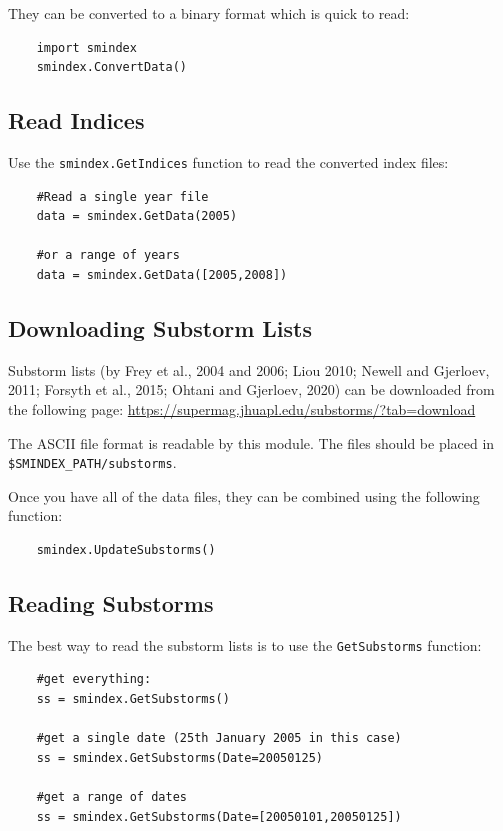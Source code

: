 	They can be converted to a binary format which is quick to read:
	
	\begin{verbatim}
	import smindex
	smindex.ConvertData()
	\end{verbatim}
	
	\subsection{Read Indices}
	
	Use the \texttt{smindex.GetIndices} function to read the converted index files:
	
	\begin{verbatim}
	#Read a single year file
	data = smindex.GetData(2005)
	
	#or a range of years
	data = smindex.GetData([2005,2008])
	\end{verbatim}
	
	\subsection{Downloading Substorm Lists}
	
	Substorm lists (by Frey et al., 2004 and 2006; Liou 2010; Newell and Gjerloev, 2011; Forsyth et al., 2015; Ohtani and Gjerloev, 2020) can be downloaded from the following page: \url{https://supermag.jhuapl.edu/substorms/?tab=download}
	
	The ASCII file format is readable by this module. The files should be placed in \texttt{\$SMINDEX_PATH/substorms}.
	
	Once you have all of the data files, they can be combined using the following function:
	
	\begin{verbatim}
	smindex.UpdateSubstorms()
	\end{verbatim}
	
	\subsection{Reading Substorms}
	
	The best way to read the substorm lists is to use the \texttt{GetSubstorms} function:
	
	\begin{verbatim}
	#get everything:
	ss = smindex.GetSubstorms()
	
	#get a single date (25th January 2005 in this case)
	ss = smindex.GetSubstorms(Date=20050125)
	
	#get a range of dates
	ss = smindex.GetSubstorms(Date=[20050101,20050125])
	\end{verbatim}
	


